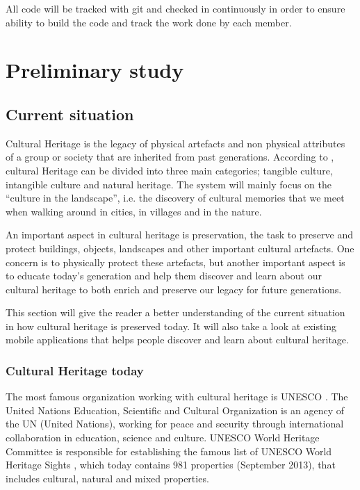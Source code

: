 \documentclass[11pt]{book}
\begin{document}
All code will be tracked with git and checked in continuously in order to ensure ability to build the code and track the work done by each member.

\chapter{Preliminary study}
\label{chap:preliminary_study}

\section{Current situation}
Cultural Heritage is the legacy of physical artefacts and non physical attributes of a group or society that are inherited from past generations. According to \cite{CiD:culturalheritage}, cultural Heritage can be divided into three main categories; tangible culture, intangible culture and natural heritage. The system will mainly focus on the ``culture in the landscape'', i.e. the discovery of cultural memories that we meet when walking around in cities, in villages and in the nature.

An important aspect in cultural heritage is preservation, the task to preserve and protect buildings, objects, landscapes and other important cultural artefacts. One concern is to physically protect these artefacts, but another important aspect is to educate today's generation and help them discover and learn about our cultural heritage to both enrich and preserve our legacy for future generations.

This section will give the reader a better understanding of the current situation in how cultural heritage is preserved today. It will also take a look at existing mobile applications that helps people discover and learn about cultural heritage.

\subsection{Cultural Heritage today}
The most famous organization working with cultural heritage is UNESCO \cite{UNESCO:intro}. The United Nations Education, Scientific and Cultural Organization is an agency of the UN (United Nations), working for peace and security through international collaboration in education, science and culture. UNESCO World Heritage Committee is responsible for establishing  the famous list of UNESCO World Heritage Sights \cite{UNESCO:worldheritage}, which today contains 981 properties (September 2013), that includes cultural, natural and mixed properties.
\end{document}
